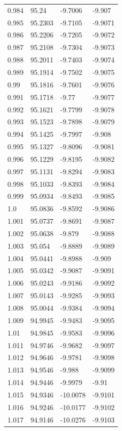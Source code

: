 \begin{tabular}{llll}
0.984 & 95.24 & -9.7006 & -9.907 \\
0.985 & 95.2303 & -9.7105 & -9.9071 \\
0.986 & 95.2206 & -9.7205 & -9.9072 \\
0.987 & 95.2108 & -9.7304 & -9.9073 \\
0.988 & 95.2011 & -9.7403 & -9.9074 \\
0.989 & 95.1914 & -9.7502 & -9.9075 \\
0.99 & 95.1816 & -9.7601 & -9.9076 \\
0.991 & 95.1718 & -9.77 & -9.9077 \\
0.992 & 95.1621 & -9.7799 & -9.9078 \\
0.993 & 95.1523 & -9.7898 & -9.9079 \\
0.994 & 95.1425 & -9.7997 & -9.908 \\
0.995 & 95.1327 & -9.8096 & -9.9081 \\
0.996 & 95.1229 & -9.8195 & -9.9082 \\
0.997 & 95.1131 & -9.8294 & -9.9083 \\
0.998 & 95.1033 & -9.8393 & -9.9084 \\
0.999 & 95.0934 & -9.8493 & -9.9085 \\
1.0 & 95.0836 & -9.8592 & -9.9086 \\
1.001 & 95.0737 & -9.8691 & -9.9087 \\
1.002 & 95.0638 & -9.879 & -9.9088 \\
1.003 & 95.054 & -9.8889 & -9.9089 \\
1.004 & 95.0441 & -9.8988 & -9.909 \\
1.005 & 95.0342 & -9.9087 & -9.9091 \\
1.006 & 95.0243 & -9.9186 & -9.9092 \\
1.007 & 95.0143 & -9.9285 & -9.9093 \\
1.008 & 95.0044 & -9.9384 & -9.9094 \\
1.009 & 94.9945 & -9.9483 & -9.9095 \\
1.01 & 94.9845 & -9.9583 & -9.9096 \\
1.011 & 94.9746 & -9.9682 & -9.9097 \\
1.012 & 94.9646 & -9.9781 & -9.9098 \\
1.013 & 94.9546 & -9.988 & -9.9099 \\
1.014 & 94.9446 & -9.9979 & -9.91 \\
1.015 & 94.9346 & -10.0078 & -9.9101 \\
1.016 & 94.9246 & -10.0177 & -9.9102 \\
1.017 & 94.9146 & -10.0276 & -9.9103 \\

\end{tabular}

